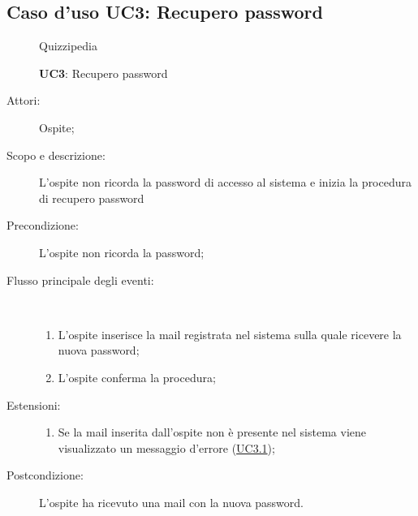 \subsection{Caso d'uso UC3: Recupero password}
\begin{figure}[H]
	\centering
	\begin{resizedtikzpicture}{\textwidth}
		\begin{umlsystem}[x=0, fill=lightgray!20]{Quizzipedia}
		\end{umlsystem}
	\end{resizedtikzpicture}
	\caption{\textbf{UC3}: Recupero password}
	\label{UC3}
\end{figure}
\begin{description}
	\item[Attori:] Ospite;
	\item[Scopo e descrizione:] L'ospite non ricorda la password di accesso al sistema e inizia la procedura di recupero password 
	\item[Precondizione:] L'ospite non ricorda la password;
	
	\item[Flusso principale degli eventi:] \ 
	\begin{enumerate}
		\item L'ospite inserisce la mail registrata nel sistema sulla quale ricevere la nuova password;
		\item L'ospite conferma la procedura;
		
	\end{enumerate}
	\item[Estensioni:]
	\begin{enumerate}
		\item Se la mail inserita dall'ospite non è presente nel sistema viene visualizzato un messaggio d'errore (\hyperlink{UC3.1}{UC3.1});
		
	\end{enumerate}
	\item[Postcondizione:] L'ospite ha ricevuto una mail con la nuova password.
\end{description}
\hypertarget{UC3.1}{}
